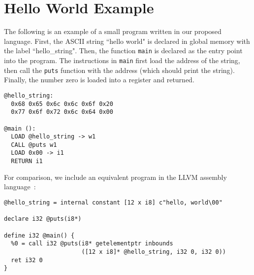 \section{Hello World Example}

The following is an example of a small program written in our proposed language.
First, the ASCII string ``hello world" is declared in global memory
with the label ``hello\_string".
Then, the function \texttt{main} is declared as the entry point
into the program. The instructions in \texttt{main} first load the address
of the string, then call the \texttt{puts} function with the address
(which should print the string). Finally, the number zero is loaded
into a register and returned.
\begin{verbatim}
@hello_string:
  0x68 0x65 0x6c 0x6c 0x6f 0x20
  0x77 0x6f 0x72 0x6c 0x64 0x00

@main ():
  LOAD @hello_string -> w1
  CALL @puts w1
  LOAD 0x00 -> i1
  RETURN i1
\end{verbatim}
For comparison, we include an equivalent program in the LLVM assembly language~\cite{lattner2008llvm}:
\begin{verbatim}
@hello_string = internal constant [12 x i8] c"hello, world\00"

declare i32 @puts(i8*)

define i32 @main() {
  %0 = call i32 @puts(i8* getelementptr inbounds
                      ([12 x i8]* @hello_string, i32 0, i32 0))
  ret i32 0
}
\end{verbatim}
